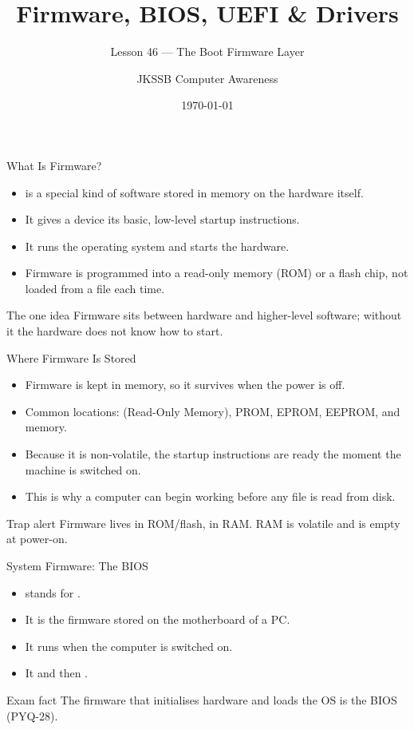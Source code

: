 \documentclass[aspectratio=169]{beamer}
\title{Firmware, BIOS, UEFI \& Drivers}
\subtitle{Lesson 46 --- The Boot Firmware Layer}
\author{JKSSB Computer Awareness}
\date{\today}
\begin{document}
\frame{\titlepage}

\begin{frame}{What Is Firmware?}
  \begin{itemize}
    \item {} is a special kind of software stored in
       memory on the hardware itself.
    \item It gives a device its basic, low-level startup instructions.
    \item It runs  the operating system and starts the hardware.
    \item Firmware is programmed into a read-only memory (ROM) or a flash
      chip, not loaded from a file each time.
  \end{itemize}
  \begin{block}{The one idea}
    Firmware sits between hardware and higher-level software; without it the
    hardware does not know how to start.
  \end{block}
\end{frame}

\begin{frame}{Where Firmware Is Stored}
  \begin{itemize}
    \item Firmware is kept in  memory, so it survives when
      the power is off.
    \item Common locations:  (Read-Only Memory), PROM, EPROM, EEPROM,
      and  memory.
    \item Because it is non-volatile, the startup instructions are ready the
      moment the machine is switched on.
    \item This is why a computer can begin working before any file is read
      from disk.
  \end{itemize}
  \begin{alertblock}{Trap alert}
    Firmware lives in ROM/flash,  in RAM. RAM is volatile and is
    empty at power-on.
  \end{alertblock}
\end{frame}

\begin{frame}{System Firmware: The BIOS}
  \begin{itemize}
    \item {} stands for .
    \item It is the firmware stored on the motherboard of a PC.
    \item It runs  when the computer is switched on.
    \item It  and then .
  \end{itemize}
  \begin{block}{Exam fact}
    The firmware that initialises hardware and loads the OS is the BIOS
    (PYQ-28).
  \end{block}
\end{frame}
\end{document}
